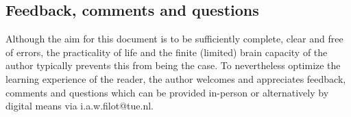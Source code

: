 %
%
%
\subsection{Feedback, comments and questions}

Although the aim for this document is to be sufficiently complete, clear and free of errors, the practicality of life and the finite (limited) brain capacity of the author typically prevents this from being the case. To nevertheless optimize the learning experience of the reader, the author welcomes and appreciates feedback, comments and questions which can be provided in-person or alternatively by digital means via i.a.w.filot@tue.nl.